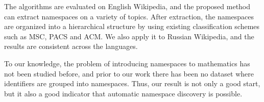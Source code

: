 
The algorithms are evaluated on English Wikipedia, and the proposed method
can extract namespaces on a variety of topics. After extraction, the namespaces 
are organized into a hierarchical structure by using existing classification schemes 
such as MSC, PACS and ACM.
We also apply it to Russian Wikipedia, and the results are consistent across
the languages.

To our knowledge, the problem of introducing namespaces to mathematics has not
been studied before, and prior to our work there has been no dataset where identifiers
are grouped into namespaces. Thus, our result is not only a good start,
but it also a good indicator that automatic namespace discovery is possible.
